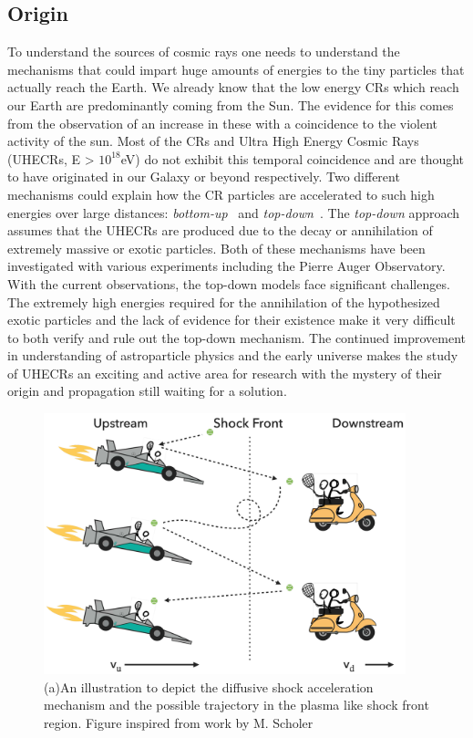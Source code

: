 \subsection{Origin}
\label{subsec:crorig}
To understand the sources of cosmic rays one needs to understand the mechanisms that could impart huge amounts of energies to the tiny particles that actually reach the Earth. We already know that the low energy CRs which reach our Earth are predominantly coming from the Sun. The evidence for this comes from the observation of an increase in these with a coincidence to the violent activity of the sun. Most of the CRs and Ultra High Energy Cosmic Rays (UHECRs, E > $10^{18}$eV) do not exhibit this temporal coincidence and are thought to have originated in our Galaxy or beyond respectively. Two different mechanisms could explain how the CR particles are accelerated to such high energies over large distances: \textit{bottom-up}~\cite{1984ARA&A..22..425H,Blandford_2000,1993A&A...272..161R} and \textit{top-down}~\cite{Bhattacharjee_2000,Busca_2006}. The \textit{top-down} approach assumes that the UHECRs are produced due to the decay or annihilation of extremely massive or exotic particles.
Both of these mechanisms have been investigated with various experiments including the Pierre Auger Observatory. With the current observations, the top-down models face significant challenges. The extremely high energies required for the annihilation of the hypothesized exotic particles and the lack of evidence for their existence make it very difficult to both verify and rule out the top-down mechanism. The continued improvement in understanding of astroparticle physics and the early universe makes the study of UHECRs an exciting and active area for research with the mystery of their origin and propagation still waiting for a solution. 

\begin{figure}[t!]
  \centering
  \includegraphics[width=10.5cm]{thesis_figures/CRnNu/Diffusive-shock-cartoon.pdf}
  \caption{(a)An illustration to depict the diffusive shock acceleration mechanism and the possible trajectory in the plasma like shock front region. Figure inspired from work by M. Scholer}
  \label{fig:Shock_cartoon}
\end{figure}

